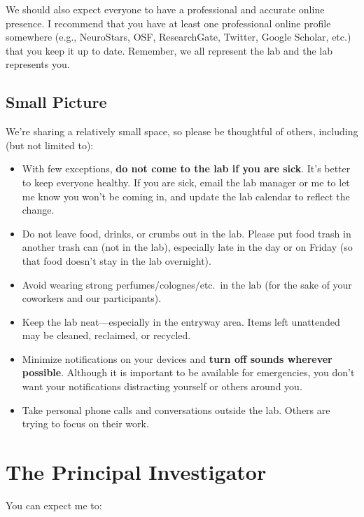 \documentclass[letterpaper,11pt,oneside]{memoir}
\begin{document}
We should also expect everyone to have a professional and accurate online presence. I recommend that you have at least one professional online profile somewhere (e.g., NeuroStars, OSF, ResearchGate, Twitter, Google Scholar, etc.) that you keep it up to date. Remember, we all represent the lab and the lab represents you.


\subsection{Small Picture}

We're sharing a relatively small space, so please be thoughtful of others, including (but not limited to):

\begin{itemize}
\item With few exceptions, \textbf{do not come to the lab if you are sick}. It's better to keep everyone healthy. If you are sick, email the lab manager or me to let me know you won't be coming in, and update the lab calendar to reflect the change.
\item Do not leave food, drinks, or crumbs out in the lab. Please put food trash in another trash can (not in the lab), especially late in the day or on Friday (so that food doesn't stay in the lab overnight).
\item Avoid wearing strong perfumes/colognes/etc.\ in the lab (for the sake of your coworkers and our participants).
\item Keep the lab neat---especially in the entryway area. Items left unattended may be cleaned, reclaimed, or recycled.
\item Minimize notifications on your devices and \textbf{turn off sounds wherever possible}. Although it is important to be available for emergencies, you don't want your notifications distracting yourself or others around you.
\item Take personal phone calls and conversations outside the lab. Others are trying to focus on their work.
\end{itemize}


\section{The Principal Investigator}

You can expect me to:
\end{document}
